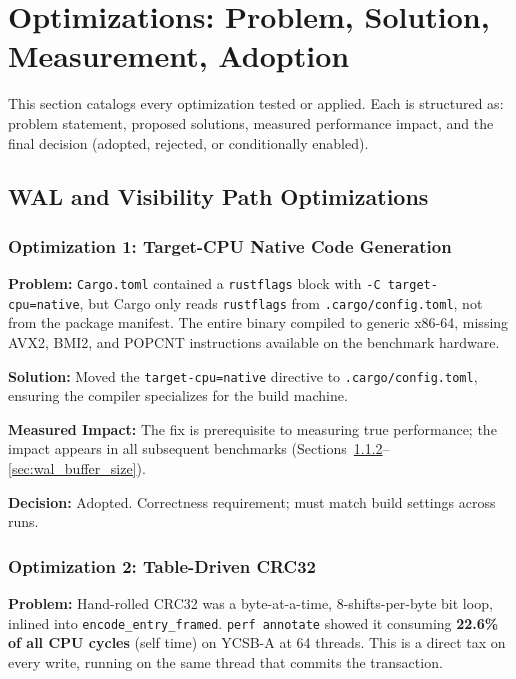 \documentclass[11pt]{article}
\newcommand{\code}[1]{\texttt{#1}}
\begin{document}
\newpage

\section{Optimizations: Problem, Solution, Measurement, Adoption}
\label{sec:optimizations}

This section catalogs every optimization tested or applied. Each is structured as:
problem statement, proposed solutions, measured performance impact, and the final
decision (adopted, rejected, or conditionally enabled).

\subsection{WAL and Visibility Path Optimizations}
\label{sec:wal_optimizations}

\subsubsection{Optimization 1: Target-CPU Native Code Generation}

\textbf{Problem:}
\code{Cargo.toml} contained a \code{rustflags} block with \code{-C target-cpu=native},
but Cargo only reads \code{rustflags} from \code{.cargo/config.toml}, not from the
package manifest. The entire binary compiled to generic x86-64, missing AVX2, BMI2, and POPCNT
instructions available on the benchmark hardware.

\textbf{Solution:}
Moved the \code{target-cpu=native} directive to \code{.cargo/config.toml}, ensuring the
compiler specializes for the build machine.

\textbf{Measured Impact:}
The fix is prerequisite to measuring true performance; the impact appears in all subsequent
benchmarks (Sections~\ref{sec:wal_crc32}--\ref{sec:wal_buffer_size}).

\textbf{Decision:} Adopted. Correctness requirement; must match build settings across
runs.

\subsubsection{Optimization 2: Table-Driven CRC32}
\label{sec:wal_crc32}

\textbf{Problem:}
Hand-rolled CRC32 was a byte-at-a-time, 8-shifts-per-byte bit loop, inlined into
\code{encode\_entry\_framed}. \code{perf annotate} showed it consuming \textbf{22.6\% of all
CPU cycles} (self time) on YCSB-A at 64 threads. This is a direct tax on every write, running
on the same thread that commits the transaction.
\end{document}
